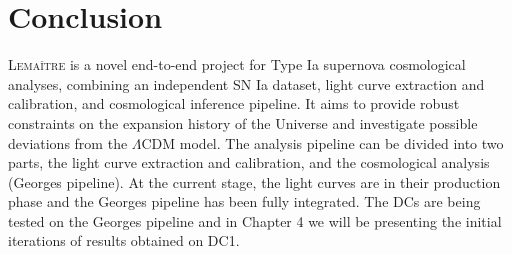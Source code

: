 \section{Conclusion}

\textsc{Lemaître} is a novel end-to-end project for Type Ia supernova cosmological analyses, combining an independent SN Ia dataset, light curve extraction and calibration, 
and cosmological inference pipeline. It aims to provide robust constraints on the expansion history of the Universe and investigate possible deviations 
from the $\Lambda$CDM model. The analysis pipeline can be divided into two parts, the light curve extraction and calibration, and the cosmological analysis (Georges pipeline). 
At the current stage, the light curves are in their production phase and the Georges pipeline has been fully integrated. The DCs are being tested 
on the Georges pipeline and in Chapter 4 we will be presenting the initial iterations of results obtained on DC1. \\